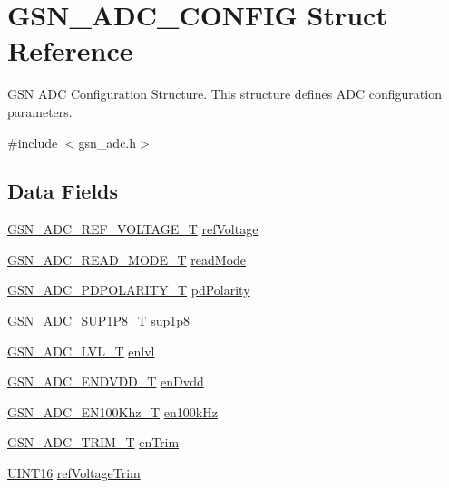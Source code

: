 \hypertarget{a00023}{
\section{GSN\_\-ADC\_\-CONFIG Struct Reference}
\label{a00023}
}


GSN ADC Configuration Structure. This structure defines ADC configuration parameters.  




{\ttfamily \#include $<$gsn\_\-adc.h$>$}

\subsection*{Data Fields}
\begin{DoxyCompactItemize}
\item 
\hyperlink{a00643_ga560e320e7f3b88d78bb8d8766a8c7445}{GSN\_\-ADC\_\-REF\_\-VOLTAGE\_\-T} \hyperlink{a00023_ac0bb9f5eae3d25dcaba26a215085973c}{refVoltage}
\item 
\hyperlink{a00643_ga67df3ab0d6b619d585d941ad1f3f0233}{GSN\_\-ADC\_\-READ\_\-MODE\_\-T} \hyperlink{a00023_adc1c91e0c2cb5edf545342b449c9d8c3}{readMode}
\item 
\hyperlink{a00643_gadc237f56f621b5000b7ed2b2617ff364}{GSN\_\-ADC\_\-PDPOLARITY\_\-T} \hyperlink{a00023_aa94e3208ee17e78caee4087b51935b6f}{pdPolarity}
\item 
\hyperlink{a00643_ga79b5244aa923d094c80c37462b10dded}{GSN\_\-ADC\_\-SUP1P8\_\-T} \hyperlink{a00023_a3414254e0076bc624e0d9343307efbbf}{sup1p8}
\item 
\hyperlink{a00643_ga5a94fb4298f40809bab65da9dd446da7}{GSN\_\-ADC\_\-LVL\_\-T} \hyperlink{a00023_a0864e408c6d88b47673b06c8049431c2}{enlvl}
\item 
\hyperlink{a00643_ga704b8e4a05f99219d70f32cbf2fb4ca5}{GSN\_\-ADC\_\-ENDVDD\_\-T} \hyperlink{a00023_ac7b39aee6c3743b4051577764b29a1c6}{enDvdd}
\item 
\hyperlink{a00643_gacdca24ad9324635589139ad12ce67090}{GSN\_\-ADC\_\-EN100Khz\_\-T} \hyperlink{a00023_a743957855a5247965447d3b99e55b55b}{en100kHz}
\item 
\hyperlink{a00643_gace83cba6b68fe265f09d30cda1ef0e63}{GSN\_\-ADC\_\-TRIM\_\-T} \hyperlink{a00023_ad3101adef29a907da1ad8cbf7f5921a4}{enTrim}
\item 
\hyperlink{a00660_ga09f1a1fb2293e33483cc8d44aefb1eb1}{UINT16} \hyperlink{a00023_aaee241ccf09d4b6bb1c7096fb0348538}{refVoltageTrim}
\item 

\end{DoxyCompactItemize}
